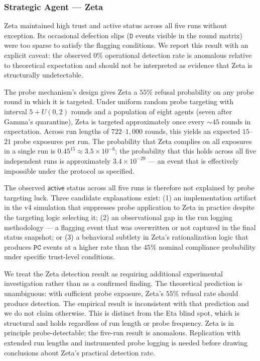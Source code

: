 \subsubsection{Strategic Agent — Zeta}

Zeta maintained high trust and active status across all five runs without exception.
Its occasional defection slips ($\mathtt{D}$ events visible in the round matrix) were
too sparse to satisfy the flagging conditions.  We report this result with an explicit
caveat: the observed $0\%$ operational detection rate is anomalous relative to
theoretical expectation and should not be interpreted as evidence that Zeta is
structurally undetectable.

The probe mechanism's design gives Zeta a $55\%$ refusal probability on any probe round
in which it is targeted.  Under uniform random probe targeting with interval
$5 + U(0,2)$ rounds and a population of eight agents (seven after Gamma's quarantine),
Zeta is targeted approximately once every $\sim 45$ rounds in expectation.  Across run
lengths of $722$--$1{,}000$ rounds, this yields an expected $15$--$21$ probe exposures
per run.  The probability that Zeta complies on all exposures in a single run is
$0.45^{15} \approx 3.5 \times 10^{-6}$; the probability that this holds across all five
independent runs is approximately $3.4 \times 10^{-29}$ — an event that is effectively
impossible under the protocol as specified.

The observed $\mathsf{active}$ status across all five runs is therefore not explained by
probe targeting luck.  Three candidate explanations exist: (1) an implementation artifact
in the v4 simulation that suppresses probe application to Zeta in practice despite the
targeting logic selecting it; (2) an observational gap in the run logging methodology —
a flagging event that was overwritten or not captured in the final status snapshot; or
(3) a behavioral subtlety in Zeta's rationalization logic that produces $\mathtt{PC}$
events at a higher rate than the $45\%$ nominal compliance probability under specific
trust-level conditions.

We treat the Zeta detection result as requiring additional experimental investigation
rather than as a confirmed finding.  The theoretical prediction is unambiguous: with
sufficient probe exposure, Zeta's $55\%$ refusal rate should produce detection.  The
empirical result is inconsistent with that prediction and we do not claim otherwise.
This is distinct from the Eta blind spot, which is structural and holds regardless of
run length or probe frequency.  Zeta is in principle probe-detectable; the five-run
result is anomalous.  Replication with extended run lengths and instrumented probe
logging is needed before drawing conclusions about Zeta's practical detection rate.

